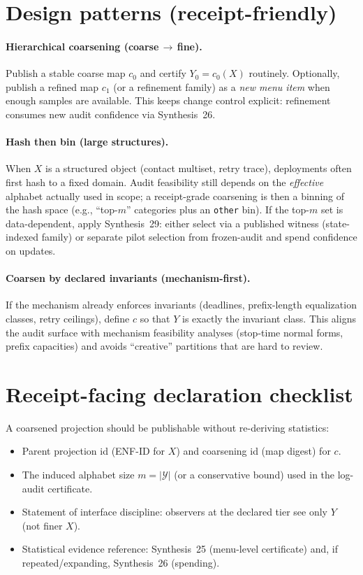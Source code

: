 \documentclass[11pt]{article}
\begin{document}
\section{Design patterns (receipt-friendly)}
\paragraph{Hierarchical coarsening (coarse\,$\to$\,fine).}
Publish a stable coarse map $c_0$ and certify $Y_0=c_0(X)$ routinely.
Optionally, publish a refined map $c_1$ (or a refinement family) as a \emph{new menu item} when enough samples are available.
This keeps change control explicit: refinement consumes new audit confidence via Synthesis~26.\cite{series:anytimespend}

\paragraph{Hash then bin (large structures).}
When $X$ is a structured object (contact multiset, retry trace), deployments often first hash to a fixed domain.
Audit feasibility still depends on the \emph{effective} alphabet actually used in scope; a receipt-grade coarsening is then a binning of the hash space (e.g., ``top-$m$'' categories plus an \texttt{other} bin).
If the top-$m$ set is data-dependent, apply Synthesis~29: either select via a published witness (state-indexed family) or separate pilot selection from frozen-audit and spend confidence on updates.\cite{series:selectiondiscipline,series:anytimespend,series:menus}

\paragraph{Coarsen by declared invariants (mechanism-first).}
If the mechanism already enforces invariants (deadlines, prefix-length equalization classes, retry ceilings), define $c$ so that $Y$ is exactly the invariant class.
This aligns the audit surface with mechanism feasibility analyses (stop-time normal forms, prefix capacities) and avoids ``creative'' partitions that are hard to review.\cite{pub:stopnormal,pub:prefixcaps}

\section{Receipt-facing declaration checklist}
A coarsened projection should be publishable without re-deriving statistics:
\begin{itemize}[leftmargin=*]
\item Parent projection id (ENF-ID for $X$) and coarsening id (map digest) for $c$.
\item The induced alphabet size $m=|\mathcal Y|$ (or a conservative bound) used in the log-audit certificate.
\item Statement of interface discipline: observers at the declared tier see only $Y$ (not finer $X$).\cite{series:traceifaces}
\item Statistical evidence reference: Synthesis~25 (menu-level certificate) and, if repeated/expanding, Synthesis~26 (spending).\cite{series:stataudit,series:anytimespend}
\end{itemize}
\end{document}
